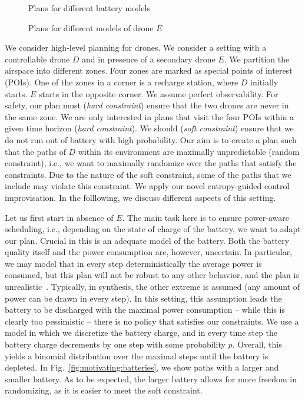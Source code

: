 
\begin{figure}

\caption{Plans for different battery models}	
\end{figure}

\begin{figure*}

\caption{Plans for different models of drone $E$}	
\end{figure*}


We consider high-level planning for drones. We consider a setting with a controllable drone $D$ and in presence of a secondary drone $E$. 
We partition the airspace into different zones. Four zones are marked as special points of interest (POIs).
One of the zones in a corner is a recharge station, where $D$ initially starts. $E$ starts in the opposite corner. We assume perfect observability.  
For safety, our plan must (\emph{hard constraint}) ensure that the two drones are never in the same zone. We are only interested in plans that visit the four POIs within a given time horizon (\emph{hard constraint}).
We should (\emph{soft constraint}) ensure that we do not run out of battery with high probability. 
Our aim is to create a plan such that the paths of $D$ within its environment are maximally unpredictable (random constraint), i.e., we want to maximally randomize over the paths that satisfy the constraints. Due to the nature of the soft constraint, some of the paths that we include may violate this constraint.  We apply our novel entropy-guided control improvisation. In the folllowing, we discuss different aspects of this setting.

Let us first start in absence of $E$. 
The main task here is to ensure power-aware scheduling, i.e., depending on the state of charge of the battery, we want to adapt our plan. Crucial in this is an adequate model of the battery. 
Both the battery quality itself and the power consumption are, however, uncertain. 
In particular, we may model that in every step deterministically the average power is consumed, but this plan will not be robust to any other behavior, and the plan is unrealistic~\cite{DBLP:conf/cyphy/HermannsKN15}. Typically, in synthesis, the other extreme is assumed (any amount of power can be drawn in every step). In this setting, this assumption leads the battery to be discharged with the maximal power consumption -- while this is clearly too pessimistic -- there is no policy that satisfies our constraints.
We use a model in which we discretize the battery charge, and in every time step the battery charge decrements by one step with some probability $p$. 
Overall, this yields a binomial distribution over the maximal steps until the battery is depleted.
In Fig.~\ref{fig:motivating:batteries}, we show paths with a larger and smaller battery. As to be expected, the larger battery allows for more freedom in randomizing, as it is easier to meet the soft constraint.


